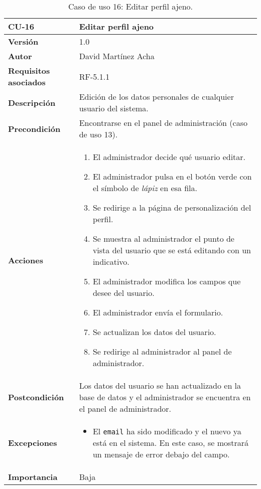 \begin{table}[p]
	\centering
	\begin{tabularx}{\linewidth}{ p{} p{} }
		\toprule
		\textbf{CU-16}    & \textbf{Editar perfil ajeno}\\
		\toprule
		\textbf{Versión}              & 1.0    \\
		\textbf{Autor}                & David Martínez Acha \\
		\textbf{Requisitos asociados} & RF-5.1.1 \\
		\textbf{Descripción}          & Edición de los datos personales de cualquier usuario del sistema. \\
		\textbf{Precondición}         & Encontrarse en el panel de administración (caso de uso 13). \\
		\textbf{Acciones}             &
		\begin{enumerate}
			\def\labelenumi{\arabic{enumi}.}
			\tightlist
			\item El administrador decide qué usuario editar.
			\item El administrador pulsa en el botón verde con el símbolo de \textit{lápiz} en esa fila.
			\item Se redirige a la página de personalización del perfil.
			\item Se muestra al administrador el punto de vista del usuario que se está editando con un indicativo.
			\item El administrador modifica los campos que desee del usuario.
			\item El administrador envía el formulario.
			\item Se actualizan los datos del usuario.
			\item Se redirige al administrador al panel de administrador.
		\end{enumerate}\\
		\textbf{Postcondición}        & Los datos del usuario se han actualizado en la base de datos y el administrador se encuentra en el panel de administrador. \\
		\textbf{Excepciones}          & \begin{itemize}
			\item El \texttt{email} ha sido modificado y el nuevo ya está en el sistema. En este caso, se mostrará un mensaje de error debajo del campo.
		\end{itemize}\\
		\textbf{Importancia}          & Baja \\
		\bottomrule
	\end{tabularx}
	\caption{Caso de uso 16: Editar perfil ajeno.}
\end{table}

